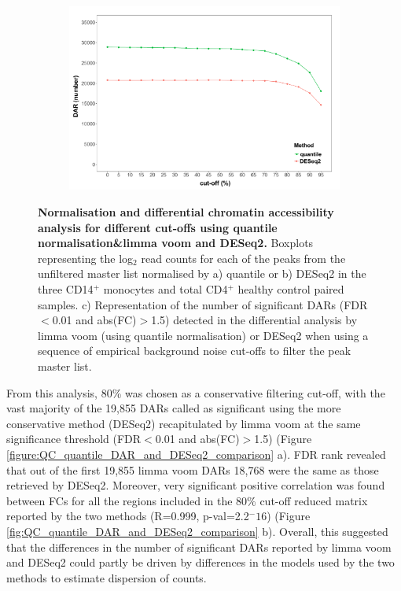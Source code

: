 \begin{figure}[htbp]
\begin{subfigure}{0.5\textwidth}
\includegraphics[width=\textwidth]{./Results1/pdfs/ATAC_Core_CD4vsCD14_DOC_FDR_01_vs_cutoffs_quantile_DESeq2_only}
\caption{\textbf{}}
\end{subfigure}

\caption[Normalisation and differential chromatin accessibility analysis for different cut-offs using quantile normalisation limma voom and DESeq2.]{\textbf{Normalisation and differential chromatin accessibility analysis for different cut-offs using quantile normalisation\&limma voom and DESeq2.} Boxplots representing the log$_2$  read counts for each of the peaks from the unfiltered master list normalised by a) quantile or b) DESeq2 in the three CD14$^+$ monocytes and total CD4$^+$  healthy control paired samples. c) Representation of the number of significant DARs (FDR$<$0.01 and abs(FC)$>$1.5) detected in the differential analysis by limma voom (using quantile normalisation) or DESeq2 when using a sequence of empirical background noise cut-offs to filter the peak master list.}
\label{figure:ATAC_normalisation_and_DARs_limma_DESeq2}
\end{figure} 


From this analysis, 80\% was chosen as a conservative filtering cut-off, with the vast majority of the 19,855  DARs called as significant using the more conservative method (DESeq2) recapitulated by limma voom at the same significance threshold (FDR$<$0.01 and abs(FC)$>$1.5) (Figure \ref{figure:QC_quantile_DAR_and_DESeq2_comparison} a). FDR rank revealed that out of the first 19,855 limma voom DARs 18,768 were the same as those retrieved by DESeq2. Moreover, very significant positive correlation was found between FCs for all the regions included in the 80\% cut-off reduced matrix reported by the two methods (R=0.999, p-val=2.2$^-16$) (Figure \ref{fig:QC_quantile_DAR_and_DESeq2_comparison} b). Overall, this suggested that the differences in the number of significant DARs reported by limma voom and DESeq2 could partly be driven by differences in the models used by the two methods to estimate dispersion of counts. 



